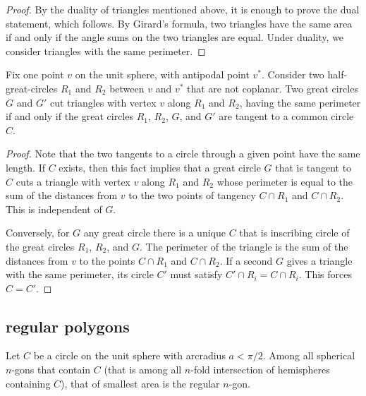 \begin{proof}  By the duality of triangles mentioned above, it is enough to prove the dual statement, which follows.  By Girard's formula, two triangles have the same area if and only if the angle sums on the two triangles are equal.
Under duality, we consider triangles with the same perimeter.
\end{proof}

\begin{lemma}  Fix one point $v$ on the unit sphere, with antipodal point $v^*$.  Consider two half-great-circles $R_1$ and $R_2$ between $v$ and $v^*$ that are not coplanar.  Two great circles $G$ and $G'$ cut triangles with vertex $v$ along $R_1$ and $R_2$, having the same perimeter if and only if the great circles $R_1$, $R_2$, $G$, and $G'$ are tangent to a common circle $C$.
\end{lemma}

\begin{proof} Note that the two tangents to a circle through a given point have the same length.  If $C$ exists, then this fact implies that a great circle $G$ that is tangent to $C$ cuts a triangle with vertex $v$ along $R_1$ and $R_2$ whose perimeter is equal to the sum of the distances from $v$ to the two points of tangency $C\cap R_1$ and $C\cap R_2$.  This is independent of $G$.

Conversely, for $G$ any great circle there is a unique $C$ that is inscribing circle of the great circles $R_1$, $R_2$, and $G$.  The perimeter of the triangle is the sum of the distances from $v$ to the points $C\cap R_1$ and $C\cap R_2$.
If a second $G$ gives a triangle with the same perimeter, its circle $C'$
must satisfy $C'\cap R_i = C\cap R_i$.  This forces $C=C'$.
\end{proof}

\subsection{regular polygons}

\begin{lemma}\label{lemma:ngon}
Let $C$ be a circle on the unit sphere with arcradius $a<\pi/2$.  Among all spherical $n$-gons that
contain $C$  (that is among all $n$-fold intersection of hemispheres containing $C$), that of smallest area is the regular $n$-gon.  
\end{lemma}

